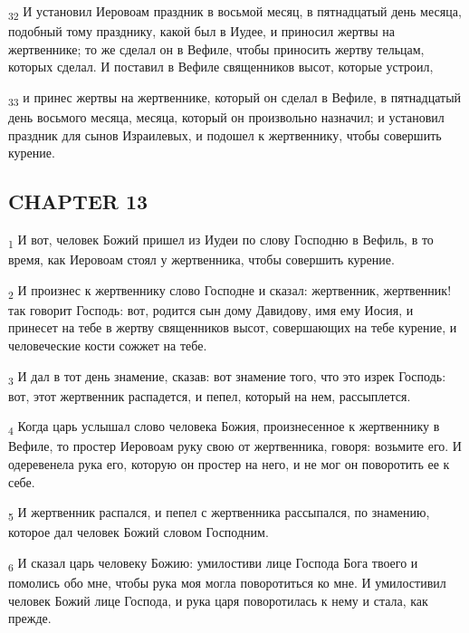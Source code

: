 \begin{tcolorbox}
\textsubscript{32} И установил Иеровоам праздник в восьмой месяц, в пятнадцатый день месяца, подобный тому празднику, какой был в Иудее, и приносил жертвы на жертвеннике; то же сделал он в Вефиле, чтобы приносить жертву тельцам, которых сделал. И поставил в Вефиле священников высот, которые устроил,
\end{tcolorbox}
\begin{tcolorbox}
\textsubscript{33} и принес жертвы на жертвеннике, который он сделал в Вефиле, в пятнадцатый день восьмого месяца, месяца, который он произвольно назначил; и установил праздник для сынов Израилевых, и подошел к жертвеннику, чтобы совершить курение.
\end{tcolorbox}
\subsection{CHAPTER 13}
\begin{tcolorbox}
\textsubscript{1} И вот, человек Божий пришел из Иудеи по слову Господню в Вефиль, в то время, как Иеровоам стоял у жертвенника, чтобы совершить курение.
\end{tcolorbox}
\begin{tcolorbox}
\textsubscript{2} И произнес к жертвеннику слово Господне и сказал: жертвенник, жертвенник! так говорит Господь: вот, родится сын дому Давидову, имя ему Иосия, и принесет на тебе в жертву священников высот, совершающих на тебе курение, и человеческие кости сожжет на тебе.
\end{tcolorbox}
\begin{tcolorbox}
\textsubscript{3} И дал в тот день знамение, сказав: вот знамение того, что это изрек Господь: вот, этот жертвенник распадется, и пепел, который на нем, рассыплется.
\end{tcolorbox}
\begin{tcolorbox}
\textsubscript{4} Когда царь услышал слово человека Божия, произнесенное к жертвеннику в Вефиле, то простер Иеровоам руку свою от жертвенника, говоря: возьмите его. И одеревенела рука его, которую он простер на него, и не мог он поворотить ее к себе.
\end{tcolorbox}
\begin{tcolorbox}
\textsubscript{5} И жертвенник распался, и пепел с жертвенника рассыпался, по знамению, которое дал человек Божий словом Господним.
\end{tcolorbox}
\begin{tcolorbox}
\textsubscript{6} И сказал царь человеку Божию: умилостиви лице Господа Бога твоего и помолись обо мне, чтобы рука моя могла поворотиться ко мне. И умилостивил человек Божий лице Господа, и рука царя поворотилась к нему и стала, как прежде.
\end{tcolorbox}
